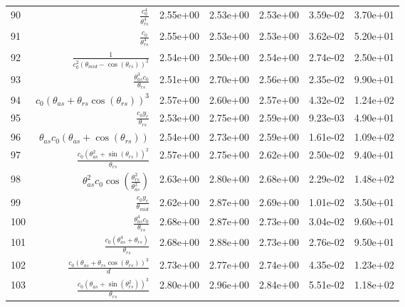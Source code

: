 \begin{tabularx}{\textwidth}{lRRRRRl}
90  &  $ \displaystyle\frac{c_{0}^{4}}{\theta_{rs}^{4}} $  &  2.55e+00  &  2.53e+00  &  2.53e+00  &  3.59e-02  &  3.70e+01  \\ 
91  &  $ \displaystyle\frac{c_{0}}{\theta_{rs}^{4}} $  &  2.55e+00  &  2.53e+00  &  2.53e+00  &  3.62e-02  &  5.20e+01  \\ 
92  &  $ \displaystyle\frac{1}{c_{0}^{2} \left(\theta_{mid} - \cos{\left(\theta_{rs} \right)}\right)^{2}} $  &  2.54e+00  &  2.50e+00  &  2.54e+00  &  2.74e-02  &  2.50e+01  \\ 
93  &  $ \displaystyle\frac{\theta_{as}^{3} c_{0}}{\theta_{rs}} $  &  2.51e+00  &  2.70e+00  &  2.56e+00  &  2.35e-02  &  9.90e+01  \\ 
94  &  $ c_{0} \left(\theta_{as} + \theta_{rs} \cos{\left(\theta_{rs} \right)}\right)^{3} $  &  2.57e+00  &  2.60e+00  &  2.57e+00  &  4.32e-02  &  1.24e+02  \\ 
95  &  $ \displaystyle\frac{c_{0} y_c}{\theta_{rs}} $  &  2.53e+00  &  2.75e+00  &  2.59e+00  &  9.23e-03  &  4.90e+01  \\ 
96  &  $ \theta_{as} c_{0} \left(\theta_{as} + \cos{\left(\theta_{rs} \right)}\right) $  &  2.54e+00  &  2.73e+00  &  2.59e+00  &  1.61e-02  &  1.09e+02  \\ 
97  &  $ \displaystyle\frac{c_{0} \left(\theta_{as}^{2} + \sin{\left(\theta_{rs} \right)}\right)^{2}}{\theta_{rs}} $  &  2.57e+00  &  2.75e+00  &  2.62e+00  &  2.50e-02  &  9.40e+01  \\ 
98  &  $ \theta_{as}^{2} c_{0} \cos{\left(\displaystyle\frac{\theta_{rs}^{2}}{\theta_{as}^{2}} \right)} $  &  2.63e+00  &  2.80e+00  &  2.68e+00  &  2.29e-02  &  1.48e+02  \\ 
99  &  $ \displaystyle\frac{c_{0} y_c}{\theta_{mid}} $  &  2.62e+00  &  2.87e+00  &  2.69e+00  &  1.01e-02  &  3.50e+01  \\ 
100  &  $ \displaystyle\frac{\theta_{as}^{4} c_{0}}{\theta_{rs}} $  &  2.68e+00  &  2.87e+00  &  2.73e+00  &  3.04e-02  &  9.60e+01  \\ 
101  &  $ \displaystyle\frac{c_{0} \left(\theta_{as}^{4} + \theta_{rs}\right)}{\theta_{rs}} $  &  2.68e+00  &  2.88e+00  &  2.73e+00  &  2.76e-02  &  9.50e+01  \\ 
102  &  $ \displaystyle\frac{c_{0} \left(\theta_{as} + \theta_{rs} \cos{\left(\theta_{rs} \right)}\right)^{3}}{d} $  &  2.73e+00  &  2.77e+00  &  2.74e+00  &  4.35e-02  &  1.23e+02  \\ 
103  &  $ \displaystyle\frac{c_{0} \left(\theta_{as} + \sin{\left(\theta_{rs}^{2} \right)}\right)^{3}}{\theta_{rs}} $  &  2.80e+00  &  2.96e+00  &  2.84e+00  &  5.51e-02  &  1.18e+02  \\ 

\end{tabularx}

